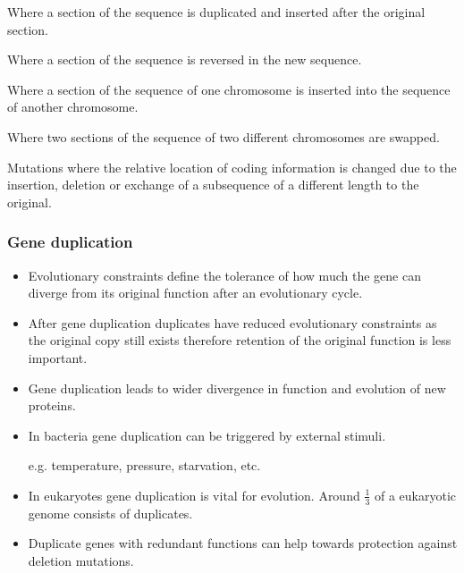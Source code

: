 \documentclass[a4paper]{article}
\begin{document}

Where a section of the sequence is duplicated and inserted after the original
section.


Where a section of the sequence is reversed in the new sequence.


Where a section of the sequence of one chromosome is inserted into the sequence
of another chromosome.


Where two sections of the sequence of two different chromosomes are swapped.


Mutations where the relative location of coding information is changed due to
the insertion, deletion or exchange of a subsequence of a different length to
the original.

\subsubsection{Gene duplication}

\begin{itemize}
  \item
    Evolutionary constraints define the tolerance of how much the gene can
    diverge from its original function after an evolutionary cycle.

  \item
    After gene duplication duplicates have reduced evolutionary constraints as
    the original copy still exists therefore retention of the original function
    is less important.

  \item
    Gene duplication leads to wider divergence in function and evolution of new
    proteins.

  \item
    In bacteria gene duplication can be triggered by external stimuli.

    e.g. temperature, pressure, starvation, etc.

  \item
    In eukaryotes gene duplication is vital for evolution. Around $\frac{1}{3}$
    of a eukaryotic genome consists of duplicates.

  \item
    Duplicate genes with redundant functions can help towards protection against
    deletion mutations.

\end{itemize}
\end{document}
